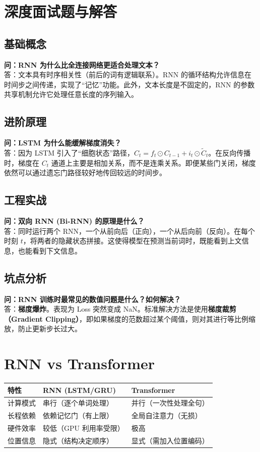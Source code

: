 \documentclass[12pt, a4paper]{article}
\begin{document}
\section{深度面试题与解答}
\subsection{基础概念}
\textbf{问：RNN 为什么比全连接网络更适合处理文本？}\\
答：文本具有时序相关性（前后的词有逻辑联系）。RNN 的循环结构允许信息在时间步之间传递，实现了“记忆”功能。此外，文本长度是不固定的，RNN 的参数共享机制允许它处理任意长度的序列输入。

\subsection{进阶原理}
\textbf{问：LSTM 为什么能缓解梯度消失？}\\
答：因为 LSTM 引入了“细胞状态”路径，$C_t = f_t \odot C_{t-1} + i_t \odot \tilde{C}_t$。在反向传播时，梯度在 $C_t$ 通道上主要是相加关系，而不是连乘关系。即便某些门关闭，梯度依然可以通过遗忘门路径较好地传回较远的时间步。

\subsection{工程实战}
\textbf{问：双向 RNN (Bi-RNN) 的原理是什么？}\\
答：同时运行两个 RNN，一个从前向后（正向），一个从后向前（反向）。在每个时刻 $t$，将两者的隐藏状态拼接。这使得模型在预测当前词时，既能看到上文信息，也能看到下文信息。

\subsection{坑点分析}
\textbf{问：RNN 训练时最常见的数值问题是什么？如何解决？}\\
答：\textbf{梯度爆炸}。表现为 Loss 突然变成 NaN。标准解决方法是使用\textbf{梯度裁剪（Gradient Clipping）}，即如果梯度的范数超过某个阈值，则对其进行等比例缩放，防止更新步长过大。

\section{RNN vs Transformer}

\begin{table}[h]
\centering
\begin{tabularx}{\textwidth}{|l|X|X|}
\hline
\textbf{特性} & \textbf{RNN (LSTM/GRU)} & \textbf{Transformer} \\
\hline
计算模式 & 串行（逐个单词处理） & 并行（一次性处理全句） \\
\hline
长程依赖 & 依赖记忆门（有上限） & 全局自注意力（无损） \\
\hline
硬件效率 & 较低（GPU 利用率受限） & 极高 \\
\hline
位置信息 & 隐式（结构决定顺序） & 显式（需加入位置编码） \\
\hline
\end{tabularx}
\end{table}
\end{document}
